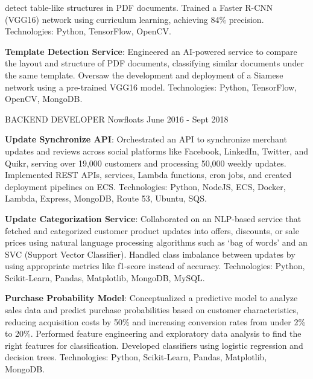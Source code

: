 \begin{cventries}
{\begin{cvitems}
{        detect table-like structures in PDF documents. \newline Trained a Faster 
        R-CNN (VGG16) network using curriculum learning, 
        achieving 84\% precision. \newline Technologies: Python, TensorFlow, OpenCV.}      
        \item{\textbf{Template Detection Service}: Engineered an AI-powered service to compare the 
        layout and structure of PDF documents, classifying similar documents under 
        the same template. \newline Oversaw the development and deployment of a Siamese network using a pre-trained 
        VGG16 model. \newline Technologies: Python, TensorFlow, OpenCV, MongoDB.}       
	\end{cvitems}
    }
\vspace{2em} %
  \cventry
    {BACKEND DEVELOPER} %
    {Nowfloats} %
    {} %
    {June 2016 - Sept 2018} %
    {
      \begin{cvitems} %
        \item{\textbf{Update Synchronize API}: Orchestrated an API to synchronize merchant updates and reviews across social platforms like Facebook, LinkedIn, Twitter, and Quikr, serving over 19,000 customers and processing 50,000 weekly updates. \newline Implemented REST APIs, services, Lambda functions, cron jobs, and created deployment pipelines on ECS. \newline Technologies: Python, NodeJS, ECS, Docker, Lambda, Express, MongoDB, Route 53, Ubuntu, SQS.}
        \item{\textbf{Update Categorization Service}: Collaborated on an NLP-based service that fetched and categorized customer product updates into offers, discounts, or sale prices using natural language processing algorithms such as ‘bag of words’ and an SVC (Support Vector Classifier). \newline 
        Handled class imbalance between updates by using appropriate metrics like f1-score instead of accuracy. 
        Technologies: Python, Scikit-Learn, Pandas, Matplotlib, MongoDB, MySQL.}
        \item{\textbf{Purchase Probability Model}: Conceptualized a predictive model to analyze sales data and predict purchase probabilities based on customer characteristics, reducing acquisition costs by 50\% and increasing conversion rates from under 2\% to 20\%. \newline
        Performed feature engineering and exploratory data analysis to find the right features for classification.
        \newline Developed classifiers using logistic regression and decision trees. \newline Technologies: Python, Scikit-Learn, Pandas, Matplotlib, MongoDB.}
      \end{cvitems}
    }

\end{cventries}